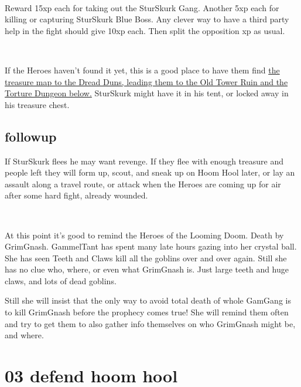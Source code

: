 \

Reward 15xp each for taking out the SturSkurk Gang. Another 5xp each for killing or capturing SturSkurk Blue Boss. Any clever way to have a third party help in the fight should give 10xp each. Then split the opposition xp as usual.

\

If the Heroes haven't found it yet, this is a good place to have them find 
\hyperref[xxtorturedungeon]{the treasure map to the Dread Duns, leading them to the Old Tower Ruin and the Torture Dungeon below.} 
SturSkurk might have it in his tent, or locked away in his treasure chest.


\subsection*{followup}

If SturSkurk flees he may want revenge. If they flee with enough treasure and people left they will form up, scout, and sneak up on Hoom Hool later, or lay an assault along a travel route, or attack when the Heroes are coming up for air after some hard fight, already wounded.

\

At this point it's good to remind the Heroes of the Looming Doom. Death by GrimGnash. GammelTant has spent many late hours gazing into her crystal ball. She has seen Teeth and Claws kill all the goblins over and over again. Still she has no clue who, where, or even what GrimGnash is. Just large teeth and huge claws, and lots of dead goblins. 

Still she will insist that the only way to avoid total death of whole GamGang is to kill GrimGnash before the prophecy comes true! She will remind them often and try to get them to also gather info themselves on who GrimGnash might be, and where.














\clearpage
\section*{03 defend hoom hool}
\label{03defendhoomhool}

